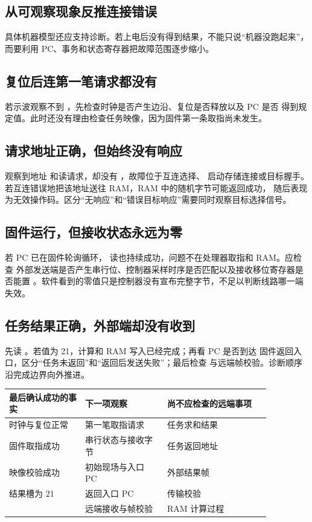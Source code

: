\subsection{从可观察现象反推连接错误}

具体机器模型还应支持诊断。若上电后没有得到结果，不能只说“机器没跑起来”，而要利用
PC、事务和状态寄存器把故障范围逐步缩小。

\subsection{复位后连第一笔请求都没有}

若示波观察不到 ，先检查时钟是否产生边沿、复位是否释放以及 PC 是否
得到规定值。此时还没有理由检查任务映像，因为固件第一条取指尚未发生。

\subsection{请求地址正确，但始终没有响应}

观察到地址  和读请求，却没有 ，故障位于互连选择、
启动存储连接或目标握手。若互连错误地把该地址送往 RAM，RAM 中的随机字节可能返回成功，
随后表现为无效操作码。区分“无响应”和“错误目标响应”需要同时观察目标选择信号。

\subsection{固件运行，但接收状态永远为零}

若 PC 已在固件轮询循环， 读也持续成功，问题不在处理器取指和 RAM。应检查
外部发送端是否产生串行位、控制器采样时序是否匹配以及接收移位寄存器是否能置
。软件看到的零值只是控制器没有宣布完整字节，不足以判断线路哪一端
失效。

\subsection{任务结果正确，外部端却没有收到}

先读 。若值为 21，计算和 RAM 写入已经完成；再看 PC 是否到达
固件返回入口，区分“任务未返回”和“返回后发送失败”；最后检查
 与远端帧校验。诊断顺序沿完成边界向外推进。

\begin{longtable}{|L{0.25\linewidth}|L{0.27\linewidth}|L{0.34\linewidth}|}
\hline
最后确认成功的事实 & 下一项观察 & 尚不应检查的远端事项 \\ \hline
时钟与复位正常 & 第一笔取指请求 & 任务求和结果 \\ \hline
固件取指成功 & 串行状态与接收字节 & 任务返回地址 \\ \hline
映像校验成功 & 初始现场与入口 PC & 外部结果帧 \\ \hline
结果槽为 21 & 返回入口 PC & 传输校验 \\ \hline
{} & 远端接收与帧校验 & RAM 计算过程 \\ \hline
\end{longtable}

